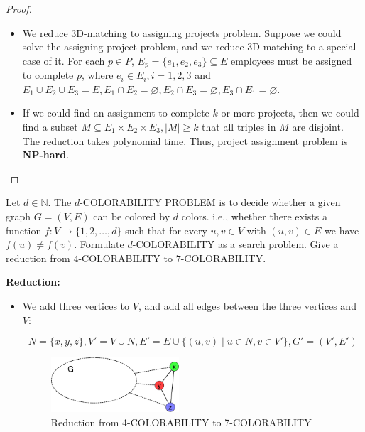 \documentclass{article}
\newcounter{exercise}
\newcommand{\<}{
    \langle}
\renewcommand{\>}{
    \rangle}
\begin{document}
{\begin{proof}
\begin{itemize}
        \item We reduce 3D-matching to assigning projects problem. Suppose we could solve the assigning project problem, and we reduce 3D-matching to a special case of it. For each $p\in P$, $E_p=\{e_1,e_2,e_3\}\subseteq E$ employees must be assigned to complete $p$, where $e_i\in E_i,i=1,2,3$ and $E_1\cup E_2\cup E_3=E,E_1\cap E_2=\varnothing,E_2\cap E_3=\varnothing,E_3\cap E_1=\varnothing$.
        \item If we could find an assignment to complete $k$ or more projects, then we could find a subset $M\subseteq E_1\times E_2\times E_3,|M|\geq k$ that all triples in $M$ are disjoint. The reduction takes polynomial time. Thus, project assignment problem is \textbf{NP-hard}.
    \end{itemize}
\end{proof}

\newpage

\begin{exercise}
Let $d\in \mathbb{N}$. The $d$-\textsf{COLORABILITY PROBLEM} is to decide whether a given graph $G=(V,E)$ can be colored by $d$ colors. i.e., whether there exists a function $f:V\rightarrow \{1,2,\ldots,d\}$ such that for every $u,v\in V$ with $(u,v)\in E$ we have $f(u)\neq f(v)$. Formulate  $d$-\textsf{COLORABILITY} as a search problem. Give a reduction from $4$-\textsc{COLORABILITY} to $7$-\textsc{COLORABILITY}.
\end{exercise}

\leavevmode\newline

\textbf{Reduction:} 
\begin{itemize}
\item We add three vertices to $V$, and add all edges between the three vertices and $V$:

\begin{displaymath} 
    N=\{x,y,z\},V'=V\cup N, E'=E\cup \{(u,v)\mid u\in N, v \in V'\},G'=(V',E')
\end{displaymath}

\begin{figure}[!htp]
    \centering
    \includegraphics[width=0.45\textwidth]{img/6.jpg}
    \caption{Reduction from 4-COLORABILITY to 7-COLORABILITY}
    \label{ggg}
  \end{figure}


\end{itemize}}
\end{document}

